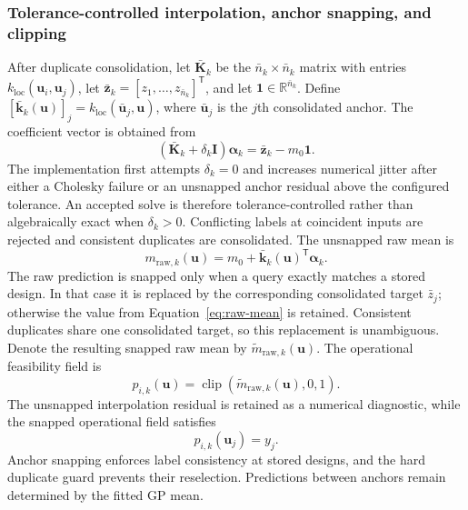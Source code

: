 \documentclass[twoside]{article}
\newcommand{\clip}{\operatorname{clip}}
\begin{document}
\subsubsection{Tolerance-controlled interpolation, anchor snapping, and clipping}

After duplicate consolidation, let \(\bar{\mathbf{K}}_k\) be the
\(\bar n_k\times\bar n_k\) matrix with entries
\(k_{\mathrm{loc}}(\mathbf{u}_i,\mathbf{u}_j)\), let
\(\bar{\mathbf{z}}_k=[z_1,\ldots,z_{\bar n_k}]^{\mathsf T}\), and let
\(\mathbf{1}\in\mathbb{R}^{\bar n_k}\). Define
\([\bar{\mathbf{k}}_k(\mathbf{u})]_j=
k_{\mathrm{loc}}(\bar{\mathbf{u}}_j,\mathbf{u})\), where
\(\bar{\mathbf{u}}_j\) is the \(j\)th consolidated anchor. The coefficient
vector is obtained from
\begin{equation}
  \left(\bar{\mathbf{K}}_k+\delta_k\mathbf{I}\right)
  \boldsymbol{\alpha}_k
  =\bar{\mathbf{z}}_k-m_0\mathbf{1}.
  \label{eq:pof-system}
\end{equation}
The implementation first attempts \(\delta_k=0\) and increases numerical
jitter after either a Cholesky failure or an unsnapped anchor residual above
the configured tolerance.  An accepted solve is therefore
tolerance-controlled rather than algebraically exact when
\(\delta_k>0\). Conflicting labels at coincident inputs are rejected and
consistent duplicates are consolidated. The unsnapped raw mean is
\begin{equation}
  m_{\mathrm{raw},k}(\mathbf{u})
  =
  m_0+\bar{\mathbf{k}}_k(\mathbf{u})^{\mathsf T}
  \boldsymbol{\alpha}_k.
  \label{eq:raw-mean}
\end{equation}
The raw prediction is snapped only when a query exactly matches a stored
design. In that case it is replaced by the corresponding consolidated target
\(\bar z_j\); otherwise the value from Equation~\eqref{eq:raw-mean} is retained.
Consistent duplicates share one consolidated target, so this replacement is
unambiguous. Denote the resulting snapped raw mean by
\(\widetilde m_{\mathrm{raw},k}(\mathbf{u})\).
The operational feasibility field is
\begin{equation}
  p_{i,k}(\mathbf{u})
  =
  \clip\!\left(\widetilde m_{\mathrm{raw},k}(\mathbf{u}),0,1\right).
  \label{eq:clipped-pof}
\end{equation}
The unsnapped interpolation residual is retained as a numerical diagnostic,
while the snapped operational field satisfies
\begin{equation}
  p_{i,k}(\mathbf{u}_j)=y_j.
  \label{eq:anchor-property}
\end{equation}
Anchor snapping enforces label consistency at stored designs, and the hard
duplicate guard prevents their reselection. Predictions between anchors remain
determined by the fitted GP mean.
\end{document}

